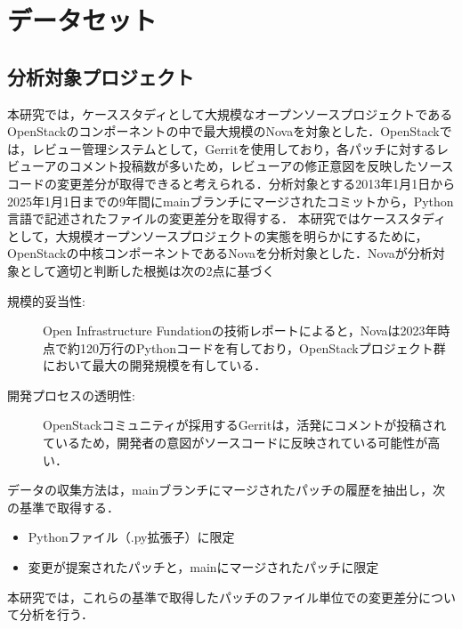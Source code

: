 \documentclass[submit,techrep,noauthor]{ipsj}
\begin{document}
\section{データセット}\label{sec:dataset}
\subsection{分析対象プロジェクト}
本研究では，ケーススタディとして大規模なオープンソースプロジェクトであるOpenStackのコンポーネントの中で最大規模のNovaを対象とした．OpenStackでは，レビュー管理システムとして，Gerritを使用しており，各パッチに対するレビューアのコメント投稿数が多いため，レビューアの修正意図を反映したソースコードの変更差分が取得できると考えられる．分析対象とする2013年1月1日から2025年1月1日までの9年間にmainブランチにマージされたコミットから，Python言語で記述されたファイルの変更差分を取得する．
本研究ではケーススタディとして，大規模オープンソースプロジェクトの実態を明らかにするために，OpenStackの中核コンポーネントであるNovaを分析対象とした．Novaが分析対象として適切と判断した根拠は次の2点に基づく
\begin{description}
    \item[規模的妥当性:]Open Infrastructure Fundationの技術レポート\cite{openstack}によると，Novaは2023年時点で約120万行のPythonコードを有しており，OpenStackプロジェクト群において最大の開発規模を有している．
    \item[開発プロセスの透明性:]OpenStackコミュニティが採用するGerritは，活発にコメントが投稿されているため，開発者の意図がソースコードに反映されている可能性が高い．
\end{description}
データの収集方法は，mainブランチにマージされたパッチの履歴を抽出し，次の基準で取得する．
\begin{itemize}
    \item Pythonファイル（.py拡張子）に限定
    \item 変更が提案されたパッチと，mainにマージされたパッチに限定
\end{itemize}
本研究では，これらの基準で取得したパッチのファイル単位での変更差分について分析を行う．

\begin{table}[h]
    \centering
    \caption{データセットから抽出したコーディングパターン候補}
\end{table}
\end{document}
